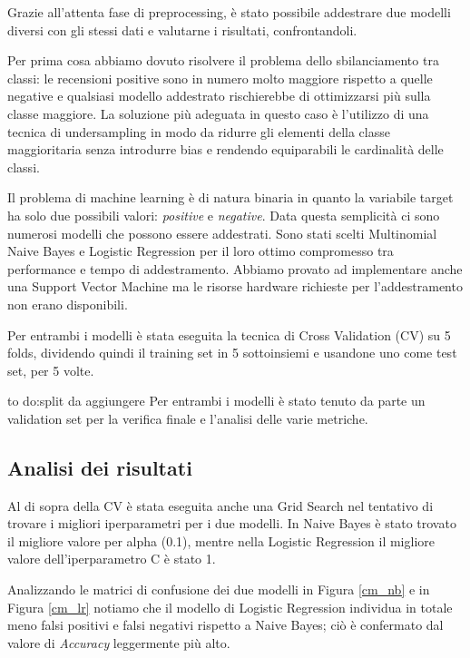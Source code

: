 \par
Grazie all'attenta fase di preprocessing, è stato possibile addestrare due modelli diversi con gli stessi dati e valutarne i risultati, confrontandoli.
\par
Per prima cosa abbiamo dovuto risolvere il problema dello sbilanciamento tra classi: le recensioni positive sono in numero molto maggiore rispetto a quelle negative e qualsiasi modello addestrato rischierebbe di ottimizzarsi più sulla classe maggiore.
La soluzione più adeguata in questo caso è l'utilizzo di una tecnica di undersampling in modo da ridurre gli elementi della classe maggioritaria senza introdurre bias e rendendo equiparabili le cardinalità delle classi.
\par
Il problema di machine learning è di natura binaria in quanto la variabile target ha solo due possibili valori: \textit{positive} e \textit{negative}.
Data questa semplicità ci sono numerosi modelli che possono essere addestrati. Sono stati scelti Multinomial Naive Bayes e Logistic Regression per il loro ottimo compromesso tra performance e tempo di addestramento. Abbiamo provato ad implementare anche una Support Vector Machine ma le risorse hardware richieste per l'addestramento non erano disponibili.
\par
Per entrambi i modelli è stata eseguita la tecnica di Cross Validation (CV) su 5 folds, dividendo quindi il training set in 5 sottoinsiemi e usandone uno come test set, per 5 volte.

to do:split da aggiungere
Per entrambi i modelli è stato tenuto da parte un validation set per la verifica finale e l'analisi delle varie metriche.

\subsection{Analisi dei risultati}

Al di sopra della CV è stata eseguita anche una Grid Search nel tentativo di trovare i migliori iperparametri per i due modelli.
In Naive Bayes è stato trovato il migliore valore per alpha (0.1), mentre nella Logistic Regression il migliore valore dell'iperparametro C è stato 1.
\par
Analizzando le matrici di confusione dei due modelli in Figura \ref{cm_nb} e in Figura \ref{cm_lr} notiamo che il modello di Logistic Regression individua in totale meno falsi positivi e falsi negativi rispetto a Naive Bayes; ciò è confermato dal valore di \textit{Accuracy} leggermente più alto.

